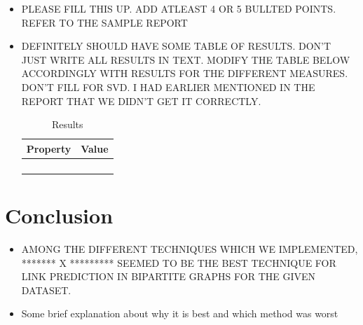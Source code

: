 \documentclass[letterpaper,twocolumn,11pt]{article}
\begin{document}
\begin{itemize}

\item PLEASE FILL THIS UP. ADD ATLEAST 4 OR 5 BULLTED POINTS. REFER TO THE SAMPLE REPORT

\item DEFINITELY SHOULD HAVE SOME TABLE OF RESULTS. DON'T JUST WRITE ALL RESULTS IN TEXT. MODIFY THE TABLE BELOW ACCORDINGLY WITH RESULTS FOR THE DIFFERENT MEASURES. DON'T FILL FOR SVD. I HAD EARLIER MENTIONED IN THE REPORT THAT WE DIDN'T GET IT CORRECTLY.

\begin{table}[ht]
	\begin{tabular}{ |p{5cm}|p{2cm} |}
		\hline
		\textbf {Property} & \textbf{Value}\\ \hline
			&	 \\  \hline
			&	\\  \hline
			&	 \\  \hline
				&	\\  \hline

		
	\end{tabular}
	\caption{Results} 
	\label{tab:dist} 
\end{table} 

\end{itemize}


\section{Conclusion}

\begin{itemize}

\item AMONG THE DIFFERENT TECHNIQUES WHICH WE IMPLEMENTED, ******* X ********* SEEMED TO BE THE BEST TECHNIQUE FOR LINK PREDICTION IN BIPARTITE GRAPHS FOR THE GIVEN DATASET.

\item Some brief explanation about why it is best and which method was worst


\end{itemize}
 
\end{document}
